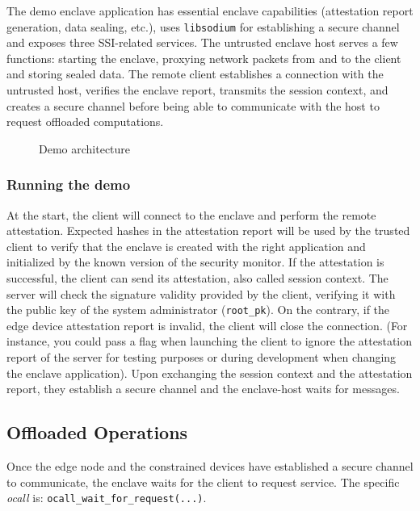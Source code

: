 The demo enclave application has essential enclave capabilities (attestation report generation, data sealing, etc.), uses \texttt{libsodium} for establishing a secure channel and exposes three SSI-related services. The untrusted enclave host serves a few functions: starting the enclave, proxying network packets from and to the client and storing sealed data. The remote client establishes a connection with the untrusted host, verifies the enclave report, transmits the session context, and creates a secure channel before being able to communicate with the host to request offloaded computations. 

\begin{figure}[!h]
    \centering
    
    \caption{Demo architecture}
    \label{poc-architecture}
\end{figure}

\subsubsection{Running the demo}

At the start, the client will connect to the enclave and perform the remote attestation. Expected hashes in the attestation report will be used by the trusted client to verify that the enclave is created with the right application and initialized by the known version of the security monitor. If the attestation is successful, the client can send its attestation, also called session context. The server will check the signature validity provided by the client, verifying it with the public key of the system administrator (\texttt{root\_pk}). On the contrary, if the edge device attestation report is invalid, the client will close the connection. (For instance, you could pass a flag when launching the client to ignore the attestation report of the server for testing purposes or during development when changing the enclave application).
Upon exchanging the session context and the attestation report, they establish a secure channel and the enclave-host waits for messages.

\subsection{Offloaded Operations}
Once the edge node and the constrained devices have established a secure channel to communicate, the enclave waits for the client to request service. The specific \textit{ocall} is: \texttt{ocall\_wait\_for\_request(...)}.
